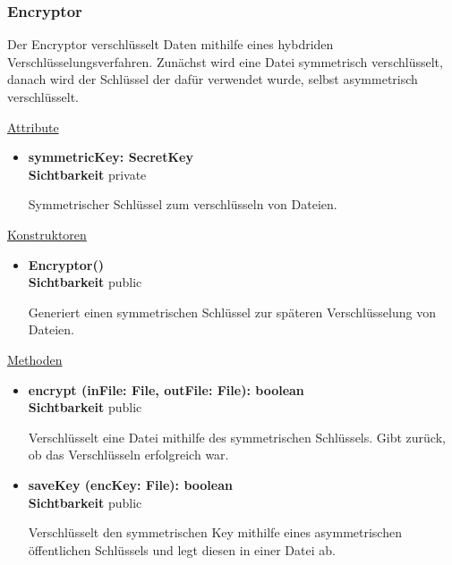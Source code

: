 \subsubsection{Encryptor} \label{app:klasse:Encryptor}
Der Encryptor verschlüsselt Daten mithilfe eines hybdriden Verschlüsselungsverfahren. Zunächst wird eine Datei symmetrisch verschlüsselt, danach wird der Schlüssel der dafür verwendet wurde, selbst asymmetrisch verschlüsselt. \newline

\underline{Attribute}
\begin{itemize}
\itemsep0pt
\item \textbf{symmetricKey: SecretKey} \hfill\\ 
\textbf{Sichtbarkeit} private

Symmetrischer Schlüssel zum verschlüsseln von Dateien.
\end{itemize}

\underline{Konstruktoren}
\begin{itemize}
\itemsep0pt
\item \textbf{Encryptor()} \hfill\\
\textbf{Sichtbarkeit} public

Generiert einen symmetrischen Schlüssel zur späteren Verschlüsselung von Dateien.
\end{itemize}

\underline{Methoden}
\begin{itemize}
\itemsep0pt
\item \textbf{encrypt (inFile: File, outFile: File): boolean}\hfill\\
\textbf{Sichtbarkeit} public

Verschlüsselt eine Datei mithilfe des symmetrischen Schlüssels. Gibt zurück, ob das Verschlüsseln erfolgreich war.

\item \textbf{saveKey (encKey: File): boolean}\hfill\\
\textbf{Sichtbarkeit} public

Verschlüsselt den symmetrischen Key mithilfe eines asymmetrischen öffentlichen Schlüssels und legt diesen in einer Datei ab.

\end{itemize}